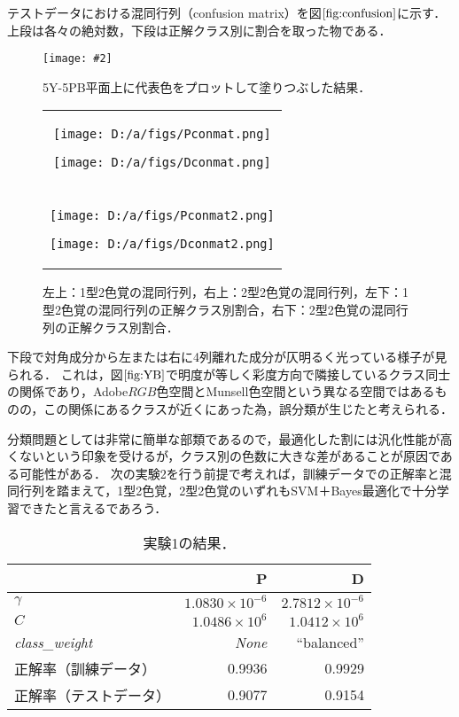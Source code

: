 \documentclass[uplatex,paper=a4,fontsize=4.0truemm,jafontsize=4.0truemm,head_space=30.0truemm,foot_space=30.0truemm,baselineskip=8.0truemm,line_length=40zw,gutter=25.0truemm,oneside,openany,fleqn,hanging_panctuation,open_bracket_pos=nibu_tentsuki,dvipdfmx,jis2004,book,titlepage]{jlreq}
\theoremstyle{mystyle}
\newcommand{\captiondot}[1]{\caption{#1．}}
\newcommand{\figureinput}[4]{\begin{figure}[btp]\centering\texttt{[image: \#2]}\captiondot{#3}\label{fig:#4}\end{figure}}
\newcommand{\tableinput}[4]{\begin{table}[btp]\centering\captiondot{#3}\label{tab:#4}\begin{tabular}{#1}#2\end{tabular}\end{table}}
\newcommand{\mathdisplaystyle}[1]{\(\displaystyle{#1}\)}
\newcommand{\Reference}[1]{\mathdisplaystyle{\ref{#1}}}
\begin{document}
				テストデータにおける混同行列（confusion matrix）を図\Reference{fig:confusion}に示す．
				上段は各々の絶対数，下段は正解クラス別に割合を取った物である．
				\figureinput{width=\linewidth}{D:/a/figs/YB.png}{5Y-5PB平面上に代表色をプロットして塗りつぶした結果}{YB}
				\begin{figure}[tbp]
					\centering
					\begin{tabular}{c}
						\begin{minipage}{0.5\linewidth}
							\centering
							\texttt{[image: D:/a/figs/Pconmat.png]}
						\end{minipage}
						\begin{minipage}{0.5\linewidth}
							\centering
							\texttt{[image: D:/a/figs/Dconmat.png]}
						\end{minipage} \\
						\begin{minipage}{0.06\linewidth}
							\vspace{10truemm}
						\end{minipage} \\
						\begin{minipage}{0.5\linewidth}
							\centering
							\texttt{[image: D:/a/figs/Pconmat2.png]}
						\end{minipage}
						\begin{minipage}{0.5\linewidth}
							\centering
							\texttt{[image: D:/a/figs/Dconmat2.png]}
						\end{minipage}
					\end{tabular}
					\captiondot{左上：1型2色覚の混同行列，右上：2型2色覚の混同行列，左下：1型2色覚の混同行列の正解クラス別割合，右下：2型2色覚の混同行列の正解クラス別割合}\label{fig:confusion}
				\end{figure}
				下段で対角成分から左または右に4列離れた成分が仄明るく光っている様子が見られる．
				これは，図\Reference{fig:YB}で明度が等しく彩度方向で隣接しているクラス同士の関係であり，Adobe\mathdisplaystyle{RGB}色空間とMunsell色空間という異なる空間ではあるものの，この関係にあるクラスが近くにあった為，誤分類が生じたと考えられる．

				分類問題としては非常に簡単な部類であるので，最適化した割には汎化性能が高くないという印象を受けるが，クラス別の色数に大きな差があることが原因である可能性がある．
				次の実験2を行う前提で考えれば，訓練データでの正解率と混同行列を踏まえて，1型2色覚，2型2色覚のいずれもSVM＋Bayes最適化で十分学習できたと言えるであろう．
				\tableinput{l|rr}{ & P & D \\ \hline
					\mathdisplaystyle{\gamma} & \mathdisplaystyle{1.0830\times{10}^{-6}} & \mathdisplaystyle{2.7812\times{10}^{-6}} \\
					\mathdisplaystyle{C} & \mathdisplaystyle{1.0486\times{10}^6} & \mathdisplaystyle{1.0412\times{10}^6} \\
					\textit{class\_weight} & \textit{None} & ``balanced'' \\
					正解率（訓練データ） & 0.9936 & 0.9929 \\
					正解率（テストデータ） & 0.9077 & 0.9154}{実験1の結果}{result1}
		\clearpage
\end{document}
